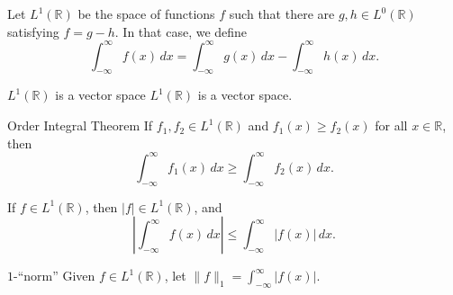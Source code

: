 
\begin{defn}{}{}
  Let \(L^1(\mathbb{R})\) be the space of functions \(f\) such that there are \(g, h \in L^0(\mathbb{R})\) satisfying \(f = g - h\). In that case, we define \[
    \int_{-\infty}^\infty f(x)\,dx =
	\int_{-\infty}^\infty g(x)\,dx -
    \int_{-\infty}^\infty h(x)\,dx.
  \] 
\end{defn}

\begin{thm}{\(L^1(\mathbb{R})\) is a vector space}{}
  \(L^1(\mathbb{R})\) is a vector space.
\end{thm}

\begin{thm}{Order Integral Theorem}{}
  If \(f_1, f_2 \in L^1(\mathbb{R})\) and \(f_1(x) \geq f_2(x)\) for all \(x \in \mathbb{R}\), then \[
    \int_{-\infty}^\infty f_1(x)\,dx \geq 
    \int_{-\infty}^\infty f_2(x)\,dx.
  \] 
\end{thm}

\begin{thm}{}{} 
  If \(f \in L^1(\mathbb{R})\), then \(|f| \in L^1(\mathbb{R})\), and \[
    \left| \int_{-\infty}^{\infty} f(x)\,dx \right| \leq
    \int_{-\infty}^{\infty} \left|f(x)\right| \,dx.
  \] 
\end{thm}

\begin{defn}{\(1\)-``norm''}{}
  Given \(f \in L^1(\mathbb{R})\), let \(\|f\|_{1} = \int_{-\infty}^\infty |f(x)|\).
\end{defn}
